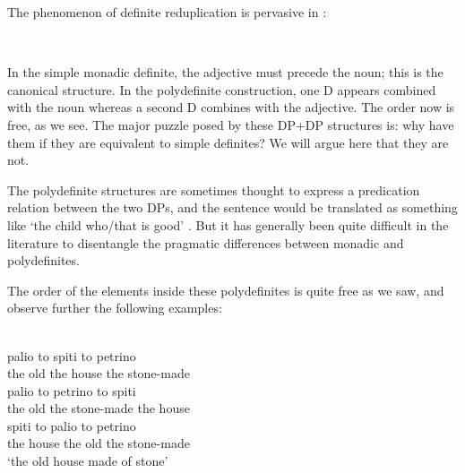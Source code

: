 \documentclass[output=paper,
modfonts
]{langscibook}
\begin{document}
The phenomenon of definite reduplication is pervasive in  \citep{AlexiadouWilder1998b, CamposStravrou2004, kolliakou2004, ioannidou-dendikken2006, lekakou-szendroi2007}:

\ea\label{ex:etxeberria:42}  \\
\z
\z

In the simple monadic definite, the adjective must precede the noun; this is the canonical structure. In the polydefinite construction, one D appears combined with the noun whereas a second D combines with the adjective. The order now is free, as we see. The major puzzle posed by these DP+DP{\cb} structures is: why have them if they are equivalent to simple definites? We will argue here that they are not.

The polydefinite structures are sometimes thought to express a predication relation between the two DPs, and the sentence would be translated as something like `the child who/that is good' \citep{AlexiadouWilder1998b, CamposStravrou2004}. But it has generally been quite difficult in the literature to disentangle the pragmatic differences between monadic and polydefinites.

The order of the elements inside these polydefinites is quite free as we saw, and observe further the following examples:

\ea\label{ex:etxeberria:43}  \\
\ea 
{} {palio} {to} {spiti} {to} {petrino}\\
the old the house the stone-made\\
\ex
{} {palio} {to} {petrino} {to} {spiti}\\
the old the stone-made the house\\
\ex
{} {spiti} {to} {palio} {to} {petrino}\\
the house the old the stone-made\\
\glt `the old house made of stone'
\z
\z
\end{document}
